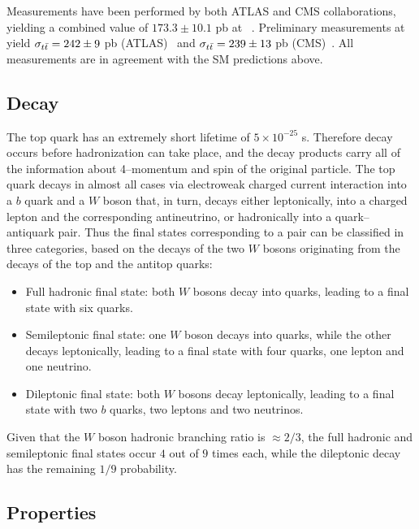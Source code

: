 Measurements have been performed by both ATLAS and CMS
collaborations, yielding a combined value of $173.3\pm10.1$ pb at
\seventev{}~\cite{ATLAS-CONF-2012-134,CMS-PAS-TOP-12-003}. Preliminary
measurements at \eighttev{} yield $\sigma_{t\bar{t}{}}=242\pm{}9$ pb
(ATLAS)~\cite{Aad:2014kva} and $\sigma_{t\bar{t}{}}=239\pm{}13$ pb
(CMS)~\cite{Chatrchyan:2013faa}. All measurements are in agreement
with the SM predictions above.

\subsection{Decay}
\label{sec:topdecay}

The top quark has an extremely short lifetime of $5\times{}10^{-25}$
s. Therefore decay occurs before hadronization can take place, and the
decay products carry all of the information about \mbox{4--momentum} and spin
of the original particle.
The top quark decays in almost all cases via electroweak
charged current interaction into a $b$ quark and a $W$ boson that,
in turn, decays either leptonically, into a charged lepton and the corresponding
antineutrino, or hadronically into a quark--antiquark pair. Thus the
final states corresponding to a \ttbar{} pair can be classified in
three categories, based on the decays of the two $W$ bosons
originating from the decays of the top and the antitop quarks:
\begin{itemize}
\item Full hadronic final state: both $W$ bosons decay into quarks,
  leading to a \ttbar{} final state with six quarks.
\item Semileptonic final state: one $W$ boson decays into quarks,
  while the other decays leptonically, leading to a final state with
  four quarks, one lepton and one neutrino.
\item Dileptonic final state: both $W$ bosons decay leptonically,
  leading to a final state with two $b$ quarks, two leptons and two
  neutrinos. 
\end{itemize}
Given that the $W$ boson hadronic branching ratio is
$\approx{}2/3$, the full hadronic and semileptonic final states occur
$4$ out of $9$ times each, while the dileptonic decay has the
remaining $1/9$ probability.  

\subsection{Properties}
\label{sec:topprop}

